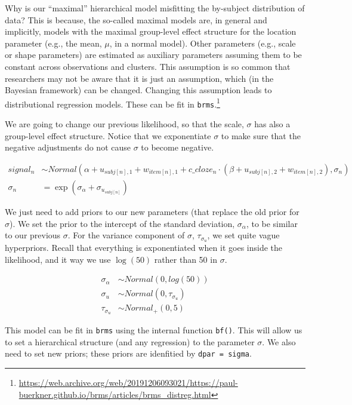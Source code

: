 \documentclass[12pt,]{krantz}
\theoremstyle{definition}
\theoremstyle{definition}
\theoremstyle{definition}
\theoremstyle{remark}
\begin{document}
Why is our ``maximal'' hierarchical model misfitting the by-subject distribution of data? This is because, the so-called maximal models are, in general and implicitly, models with the maximal group-level effect structure for the location parameter (e.g., the mean, \(\mu\), in a normal model). Other parameters (e.g., scale or shape parameters) are estimated as auxiliary parameters assuming them to be constant across observations and clusters. This assumption is so common that researchers may not be aware that it is just an assumption, which (in the Bayesian framework) can be changed. Changing this assumption leads to distributional regression models. These can be fit in \texttt{brms}.\footnote{\url{https://web.archive.org/web/20191206093021/https://paul-buerkner.github.io/brms/articles/brms_distreg.html}}

We are going to change our previous likelihood, so that the scale, \(\sigma\) has also a group-level effect structure. Notice that we exponentiate \(\sigma\) to make sure that the negative adjustments do not cause \(\sigma\) to become negative.

\begin{equation}
\begin{aligned}
  signal_n &\sim Normal(\alpha + u_{subj[n],1} + w_{item[n],1} + c\_cloze_n \cdot  (\beta + u_{subj[n],2}+ w_{item[n],2}), \sigma_n)\\
  \sigma_n &= \exp(\sigma_\alpha + \sigma_{u_{subj[n]}})
\end{aligned}
\end{equation}

We just need to add priors to our new parameters (that replace the old prior for \(\sigma\)). We set the prior to the intercept of the standard deviation, \(\sigma_\alpha\), to be similar to our previous \(\sigma\). For the variance component of \(\sigma\), \(\tau_{\sigma_u}\), we set quite vague hyperpriors. Recall that everything is exponentiated when it goes inside the likelihood, and it way we use \(\log(50)\) rather than 50 in \(\sigma\).

\begin{equation}
\begin{aligned}
  \sigma_\alpha &\sim Normal(0,log(50))\\
  \sigma_u &\sim Normal(0, \tau_{\sigma_u}) \\
  \tau_{\sigma_u} &\sim Normal_+(0, 5)
\end{aligned}
\end{equation}

This model can be fit in \texttt{brms} using the internal function \texttt{bf()}. This will allow us to set a hierarchical structure (and any regression) to the parameter \(\sigma\). We also need to set new priors; these priors are idenfitied by \texttt{dpar\ =\ sigma}.
\end{document}
